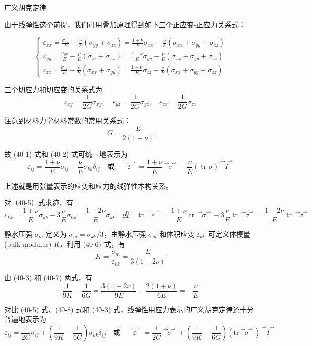 \documentclass[12pt, a4paper, oneside, UTF8]{ctexbook}  %
\newcommand{\vvec}{\overset{\rightharpoonup\!\!\!\! \rightharpoonup}}
\begin{document}
\begin{defn}
    广义胡克定律

    由于线弹性这个前提，我们可用叠加原理得到如下三个正应变-正应力关系式：

\[\left\{
\begin{aligned}
    \varepsilon_{xx} = \frac{\sigma_{xx}}{E} - \frac{\nu}{E} (\sigma_{yy} + \sigma_{zz}) = \frac{1 + \nu}{E} \sigma_{xx} - \frac{\nu}{E} (\sigma_{xx} + \sigma_{yy} + \sigma_{zz})\\
    \varepsilon_{yy} = \frac{\sigma_{yy}}{E} - \frac{\nu}{E} (\sigma_{zz} + \sigma_{xx}) = \frac{1 + \nu}{E} \sigma_{yy} - \frac{\nu}{E} (\sigma_{xx} + \sigma_{yy} + \sigma_{zz})\\
    \varepsilon_{zz} = \frac{\sigma_{zz}}{E} - \frac{\nu}{E} (\sigma_{xx} + \sigma_{yy}) = \frac{1 + \nu}{E} \sigma_{zz} - \frac{\nu}{E} (\sigma_{xx} + \sigma_{yy} + \sigma_{zz})
\end{aligned}
\right.
\tag{40-1}
\]

三个切应力和切应变的关系式为
\[
\varepsilon_{xy} = \frac{1}{2G} \sigma_{xy}, \quad \varepsilon_{yz} = \frac{1}{2G} \sigma_{yz}, \quad \varepsilon_{zx} = \frac{1}{2G} \sigma_{zx} \tag{40-2}
\]

注意到材料力学材料常数的常用关系式：
\[
G = \frac{E}{2(1+\nu)} \tag{40-3}
\]

故 (40-1) 式和 (40-2) 式可统一地表示为
\[
\varepsilon_{ij} = \frac{1+\nu}{E}\sigma_{ij} - \frac{\nu}{E}\sigma_{kk}\delta_{ij} 
\quad \text{或} \quad 
\vvec{\varepsilon} = \frac{1+\nu}{E}\vvec{\sigma} - \frac{\nu}{E}(\operatorname{tr}\sigma)\vvec{I} \tag{40-5}
\]

上述就是用张量表示的应变和应力的线弹性本构关系。

对（40-5）式求迹，有
\[
\varepsilon_{kk} = \frac{1+\nu}{E}\sigma_{kk} - 3\frac{\nu}{E}\sigma_{kk} = \frac{1-2\nu}{E}\sigma_{kk} 
\quad \text{或} \quad 
\operatorname{tr}\vvec{\varepsilon} = \frac{1+\nu}{E}\operatorname{tr}\vvec{\sigma} - 3\frac{\nu}{E}\operatorname{tr}\vvec{\sigma} = \frac{1-2\nu}{E}\operatorname{tr}\vvec{\sigma} \tag{40-6}
\]

静水压强 \(\sigma_m\) 定义为 \(\sigma_m = \sigma_{kk}/3\)，由静水压强 \(\sigma_m\) 和体积应变 \(\varepsilon_{kk}\) 可定义体模量 (bulk modulus) \(K\)，利用 (40-6) 式，有
\[
K = \frac{\sigma_m}{\varepsilon_{kk}} = \frac{E}{3(1-2\nu)} \tag{40-7}
\]

由 (40-3) 和 (40-7) 两式，有
\[
\frac{1}{9K} - \frac{1}{6G} = \frac{3(1-2\nu)}{9E} - \frac{2(1+\nu)}{6E} = -\frac{\nu}{E} \tag{40-8}
\]

对比 (40-5) 式、(40-8) 式和 (40-3) 式，线弹性用应力表示的广义胡克定律还十分普遍地表示为
\[
\varepsilon_{ij} = \frac{1}{2G}\sigma_{ij} + \left(\frac{1}{9K} - \frac{1}{6G}\right)\sigma_{kk}\delta_{ij} 
\quad \text{或} \quad 
\vvec{\varepsilon} = \frac{1}{2G}\vvec{\sigma} + \left(\frac{1}{9K} - \frac{1}{6G}\right)(\text{tr}\vvec{\sigma})\vvec{I} \tag{40-9}
\]
\end{defn}
\end{document}
